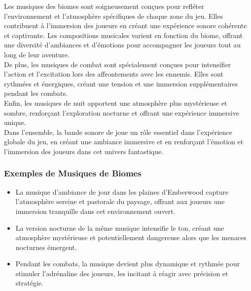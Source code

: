 Les musiques des biomes sont soigneusement conçues pour refléter l'environnement et l'atmosphère spécifiques de chaque zone du jeu. Elles contribuent à l'immersion des joueurs en créant une expérience sonore cohérente et captivante. 
Les compositions musicales varient en fonction du biome, offrant une diversité d'ambiances et d'émotions pour accompagner les joueurs tout au long de leur aventure.
\\

De plus, les musiques de combat sont spécialement conçues pour intensifier l'action et l'excitation lors des affrontements avec les ennemis. 
Elles sont rythmées et énergiques, créant une tension et une immersion supplémentaires pendant les combats.
\\

Enfin, les musiques de nuit apportent une atmosphère plus mystérieuse et sombre, renforçant l'exploration nocturne et offrant une expérience immersive unique.
\\

Dans l'ensemble, la bande sonore de \gameName joue un rôle essentiel dans l'expérience globale du jeu, en créant une ambiance immersive et en renforçant l'émotion et l'immersion des joueurs dans cet univers fantastique.

\subsubsection{Exemples de Musiques de Biomes}

\begin{itemize}

      \item La musique d'ambiance de jour dans les plaines d'Emberwood capture l'atmosphère sereine et pastorale du paysage, offrant aux joueurs une immersion tranquille dans cet environnement ouvert.
            \\

      \item La version nocturne de la même musique intensifie le ton, créant une atmosphère mystérieuse et potentiellement dangereuse alors que les menaces nocturnes émergent.
            \\

      \item Pendant les combats, la musique devient plus dynamique et rythmée pour stimuler l'adrénaline des joueurs, les incitant à réagir avec précision et stratégie.
            \\

\end{itemize}

